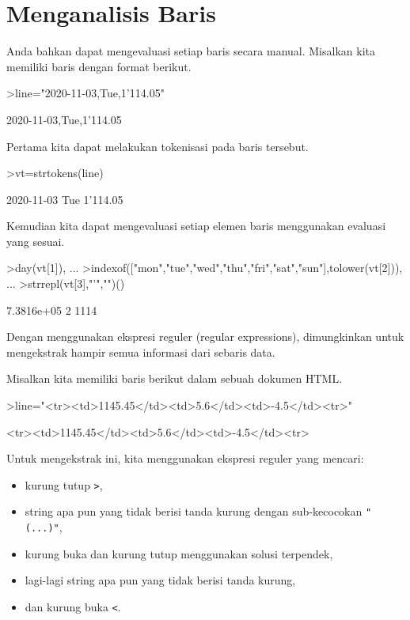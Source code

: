 \documentclass[a4paper,11pt,oneside,enabledeprecatedfontcommands]{scrbook}
\newenvironment{eulernotebook}{}{}
\newcommand{\eulerheading}[1]{\chapter{#1}}
\newenvironment{eulercomment}{\par\medskip\noindent}{\par\medskip}
\begin{document}
\begin{eulernotebook}
		\eulerheading{Menganalisis Baris}
		\begin{eulercomment}
			Anda bahkan dapat mengevaluasi setiap baris secara manual. Misalkan kita memiliki baris dengan format
			berikut.
		\end{eulercomment}
		\begin{eulerprompt}
			>line="2020-11-03,Tue,1'114.05"
		\end{eulerprompt}
		\begin{euleroutput}
			2020-11-03,Tue,1'114.05
		\end{euleroutput}
		\begin{eulercomment}
			Pertama kita dapat melakukan tokenisasi pada baris tersebut.
		\end{eulercomment}
		\begin{eulerprompt}
			>vt=strtokens(line)
		\end{eulerprompt}
		\begin{euleroutput}
			2020-11-03
			Tue
			1'114.05
		\end{euleroutput}
		\begin{eulercomment}
			Kemudian kita dapat mengevaluasi setiap elemen baris menggunakan evaluasi yang sesuai.
		\end{eulercomment}
		\begin{eulerprompt}
			>day(vt[1]),  ...
			>indexof(["mon","tue","wed","thu","fri","sat","sun"],tolower(vt[2])),  ...
			>strrepl(vt[3],"'","")()
		\end{eulerprompt}
		\begin{euleroutput}
			7.3816e+05
			2
			1114
		\end{euleroutput}
		\begin{eulercomment}
			Dengan menggunakan ekspresi reguler (regular expressions), dimungkinkan untuk mengekstrak hampir
			semua informasi dari sebaris data.
			
			Misalkan kita memiliki baris berikut dalam sebuah dokumen HTML.
		\end{eulercomment}
		\begin{eulerprompt}
			>line="<tr><td>1145.45</td><td>5.6</td><td>-4.5</td><tr>"
		\end{eulerprompt}
		\begin{euleroutput}
			<tr><td>1145.45</td><td>5.6</td><td>-4.5</td><tr>
		\end{euleroutput}
		\begin{eulercomment}
			Untuk mengekstrak ini, kita menggunakan ekspresi reguler yang mencari:
			\begin{itemize}
				\item kurung tutup \texttt{>},
				\item string apa pun yang tidak berisi tanda kurung dengan sub-kecocokan \texttt{"(...)"},
				\item kurung buka dan kurung tutup menggunakan solusi terpendek,
				\item lagi-lagi string apa pun yang tidak berisi tanda kurung,
				\item dan kurung buka \texttt{<}.
			\end{itemize}
			

\end{eulercomment}
\end{eulernotebook}
\end{document}
